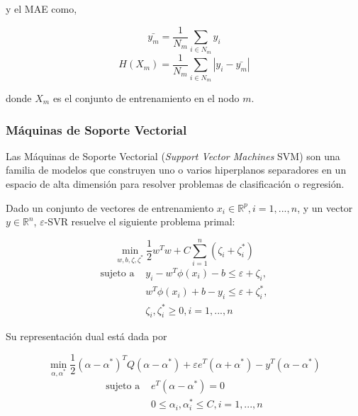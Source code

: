 \documentclass[spanish]{article}
\begin{document}
          y el MAE como,
          
          \begin{equation}
            \bar{y_m} = \frac{1}{N_m} \sum_{i \in N_m} y_i
          \end{equation}
          \begin{equation}
            H(X_m) = \frac{1}{N_m} \sum_{i \in N_m} |y_i - \bar{y_m}|
          \end{equation}
          
          donde $X_m$ es el conjunto de entrenamiento en el nodo $m$.
                            
        \subsubsection{Máquinas de Soporte Vectorial}
        
          Las Máquinas de Soporte Vectorial (\emph{Support Vector Machines} SVM) \cite{Cortes1995} son una familia de modelos 
          que construyen uno o varios hiperplanos separadores en un espacio de alta dimensión para resolver 
          problemas de clasificación o regresión. \medskip
          
          Dado un conjunto de vectores de entrenamiento $x_i \in \mathbb{R}^p, i=1, ..., n$, y un vector 
          $y \in \mathbb{R}^n$, $\varepsilon$-SVR resuelve el siguiente problema primal:
          
          \begin{equation}
            \min_ {w, b, \zeta, \zeta^*} \frac{1}{2} w^T w + C \sum_{i=1}^{n} (\zeta_i + \zeta_i^*) 
            \nonumber
          \end{equation}
          \begin{equation}
            \begin{split}
              \textrm {sujeto a } & y_i - w^T \phi (x_i) - b \leq \varepsilon + \zeta_i,\\
                & w^T \phi (x_i) + b - y_i \leq \varepsilon + \zeta_i^*,\\
                & \zeta_i, \zeta_i^* \geq 0, i=1, ..., n
            \end{split}
          \end{equation}

          Su representación dual está dada por
          
          \begin{equation}
            \min_{\alpha, \alpha^*} \frac{1}{2} (\alpha - \alpha^*)^T Q (\alpha - \alpha^*) 
              + \varepsilon e^T (\alpha + \alpha^*) - y^T (\alpha - \alpha^*)
            \nonumber
          \end{equation}
          \begin{equation}
            \begin{split}
              \textrm {sujeto a } & e^T (\alpha - \alpha^*) = 0 \\
                & 0 \leq \alpha_i, \alpha_i^* \leq C, i=1, ..., n
            \end{split}
          \end{equation}
\end{document}
